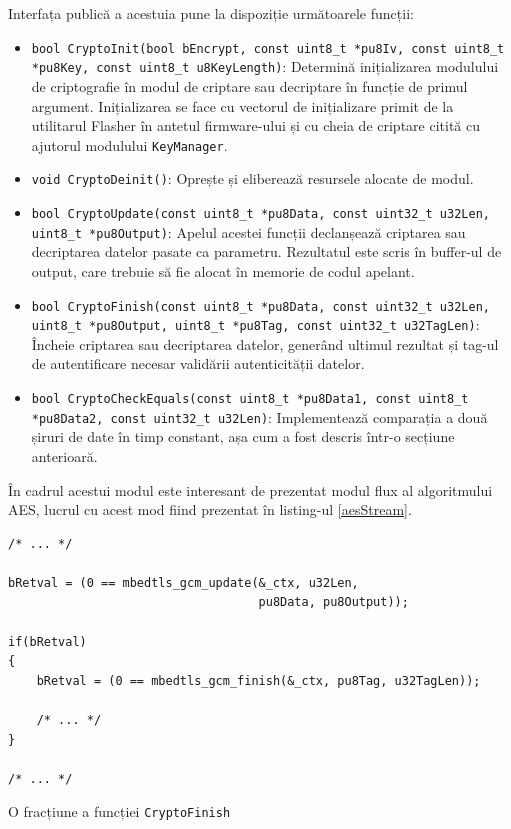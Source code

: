 \documentclass[12pt,a4paper,titlepage]{report}
\begin{document}
Interfața publică a acestuia pune la dispoziție următoarele funcții:
\begin{itemize}
\item \texttt{bool CryptoInit(bool bEncrypt, const uint8\_t *pu8Iv, const uint8\_t *pu8Key, const uint8\_t u8KeyLength)}: Determină inițializarea modulului de criptografie în modul de criptare sau decriptare în funcție de primul argument. Inițializarea se face cu vectorul de inițializare primit de la utilitarul Flasher în antetul firmware-ului și cu cheia de criptare citită cu ajutorul modulului \texttt{KeyManager}.
\item \texttt{void CryptoDeinit()}: Oprește și eliberează resursele alocate de modul.
\item \texttt{bool CryptoUpdate(const uint8\_t *pu8Data, const uint32\_t u32Len, uint8\_t *pu8Output)}: Apelul acestei funcții declanșează criptarea sau decriptarea datelor pasate ca parametru. Rezultatul este scris în buffer-ul de output, care trebuie să fie alocat în memorie de codul apelant.
\item \texttt{bool CryptoFinish(const uint8\_t *pu8Data, const uint32\_t u32Len, uint8\_t *pu8Output, uint8\_t *pu8Tag, const uint32\_t u32TagLen)}: Încheie criptarea sau decriptarea datelor, generând ultimul rezultat și tag-ul de autentificare necesar validării autenticității datelor.
\item \texttt{bool CryptoCheckEquals(const uint8\_t *pu8Data1, const uint8\_t *pu8Data2, const uint32\_t u32Len)}: Implementează comparația a două șiruri de date în timp constant, așa cum a fost descris într-o secțiune anterioară.
\end{itemize}

În cadrul acestui modul este interesant de prezentat modul flux al algoritmului AES, lucrul cu acest mod fiind prezentat în listing-ul \ref{aesStream}.

\begin{listing}[h]
\begin{verbatim}
/* ... */

bRetval = (0 == mbedtls_gcm_update(&_ctx, u32Len,
                                   pu8Data, pu8Output));

if(bRetval)
{
    bRetval = (0 == mbedtls_gcm_finish(&_ctx, pu8Tag, u32TagLen));
    
    /* ... */
}

/* ... */
\end{verbatim}

\caption{O fracțiune a funcției \texttt{CryptoFinish}}
\label{aesStream}
\end{listing}
\end{document}
